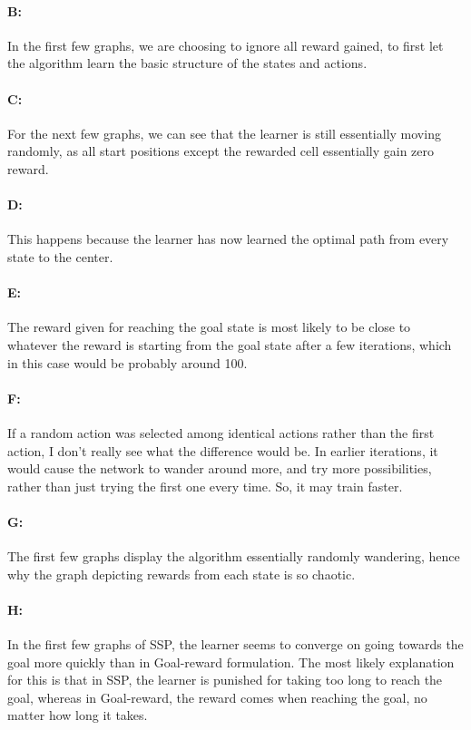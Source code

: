 \documentclass{article}
\begin{document}
\paragraph{B: } In the first few graphs, we are choosing to ignore all reward gained, to first let the algorithm learn the basic structure of the states and actions.

\paragraph{C: } For the next few graphs, we can see that the learner is still essentially moving randomly, as all start positions except the rewarded cell essentially gain zero reward.

\paragraph{D: } This happens because the learner has now learned the optimal path from every state to the center.

\paragraph{E: } The reward given for reaching the goal state is most likely to be close to whatever the reward is starting from the goal state after a few iterations, which in this case would be probably around 100.

\paragraph{F: } If a random action was selected among identical actions rather than the first action, I don't really see what the difference would be. In earlier iterations, it would cause the network to wander around more, and try more possibilities, rather than just trying the first one every time. So, it may train faster.

\paragraph{G: } The first few graphs display the algorithm essentially randomly wandering, hence why the graph depicting rewards from each state is so chaotic.

\paragraph{H: } In the first few graphs of SSP, the learner seems to converge on going towards the goal more quickly than in Goal-reward formulation. The most likely explanation for this is that in SSP, the learner is punished for taking too long to reach the goal, whereas in Goal-reward, the reward comes when reaching the goal, no matter how long it takes.
\end{document}
